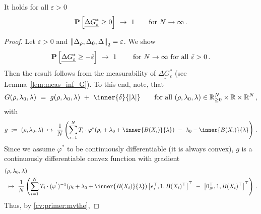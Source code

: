  \begin{lemma}
   \label{lem:conv_dG}
   \label{bw:cd:lem2}
   It holds
   for all $\varepsilon>0$
\begin{gather}
   \P
   \left[ 
     \underline{
     \Delta G^*
     _\varepsilon
     }
     \ge 
     0
   \right]
   \ 
   \to
   \ 
   1
   \qquad
   \text{for}
   \ 
   N\to\infty
   \,.
\end{gather}
 \end{lemma}
 \begin{proof}
   Let $\varepsilon>0$
   and 
   $\left\lVert
   \Delta_\rho,\Delta_0,\Delta
   \right\rVert_2=\varepsilon$.
   We show
\begin{gather}
   \P
   \left[ 
     \underline{
     \Delta G^*
     _\varepsilon
     }
     \ge 
     -\tilde{\varepsilon}
   \right]
   \ 
   \to
   \ 
   1
   \qquad
   \ 
   \text{for}
   \ 
   N\to\infty
   \ 
   \text{for all}\ 
   \tilde{\varepsilon}>0
   \,.
\end{gather}
Then the result follows from the measurability of 
$
     \underline{
     \Delta G^*
     _\varepsilon
     }
$
(see Lemma~\ref{lem:meas_inf_G}).
To this end, note, that
\begin{gather*}
  G(\rho,\lambda_0,\lambda)
  \ 
  =
  \ 
  g(\rho,\lambda_0,\lambda)
  \ 
  +
  \ 
  \inner{\delta}{|\lambda|}
  \qquad
  \text{for all}\ 
  (\rho,\lambda_0,\lambda)
  \in
  \R^N_{\ge 0}
  \times
  \R
  \times
  \R^{N}
  \,,
\end{gather*}
with
\begin{gather*}
  g
  \ 
  :=
  \ 
  (\rho,\lambda_0,\lambda)
  \ 
  \mapsto
  \ 
     \frac{1}{N}
     \left( 
\sum_{i=1} 
  ^N
  T_i
  \cdot
  \varphi^*
  \!
  \left( 
    \rho_i
    +
\lambda_0
+
\inner
{B(X_i)}
{
\lambda
}
  \right)
  \ 
  -
\ 
\lambda_0
-
\inner
{B(X_i)}
{
\lambda
}
     \right)
  \,.
\end{gather*}
Since we assume $\varphi^*$ to be continuously differentiable (it is always convex),
$g$ is a continuously differentiable convex function with gradient
\begin{align*}
  &
  (\rho,\lambda_0,\lambda)
  \\
  &
  \ 
  \mapsto
  \ 
     \frac{1}{N}
     \left( 
\sum_{i=1} 
  ^N
  T_i
  \cdot
  (
  \varphi^{'}
  )
  ^{-1}
  \!
  \left( 
    \rho_i
    +
\lambda_0
+
\inner
{B(X_i)}
{
\lambda
}
  \right)
  \left[ 
    e_i^\top,1,B(X_i)^\top
  \right]^\top
  \ 
  -
  \ 
  \left[ 
    0_N^\top,1,B(X_i)^\top
  \right]^\top
     \right)
  \,.
\end{align*}
Thus, by \eqref{cv:primer:mvthe},

\end{proof}
